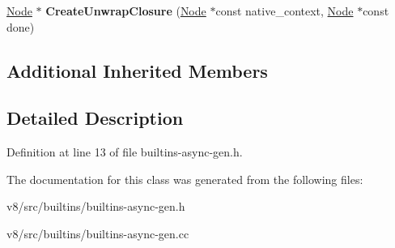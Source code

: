 \begin{DoxyCompactItemize}
\item 
\mbox{\label{classv8_1_1internal_1_1AsyncBuiltinsAssembler_a5d44920335f179ae334d6f461d66ccee}} 
\mbox{\hyperlink{classv8_1_1internal_1_1compiler_1_1Node}{Node}} $\ast$ {\bfseries Create\+Unwrap\+Closure} (\mbox{\hyperlink{classv8_1_1internal_1_1compiler_1_1Node}{Node}} $\ast$const native\+\_\+context, \mbox{\hyperlink{classv8_1_1internal_1_1compiler_1_1Node}{Node}} $\ast$const done)
\end{DoxyCompactItemize}
\subsection*{Additional Inherited Members}


\subsection{Detailed Description}


Definition at line 13 of file builtins-\/async-\/gen.\+h.



The documentation for this class was generated from the following files\+:\begin{DoxyCompactItemize}
\item 
v8/src/builtins/builtins-\/async-\/gen.\+h\item 
v8/src/builtins/builtins-\/async-\/gen.\+cc\end{DoxyCompactItemize}
